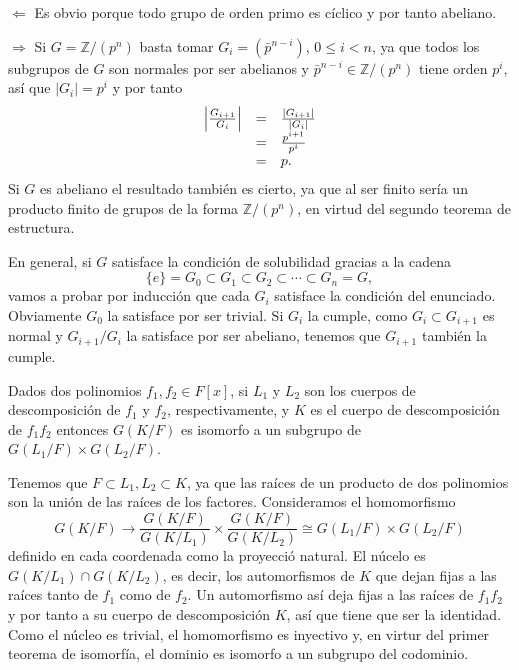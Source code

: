 \(\Leftarrow\) Es obvio porque todo grupo de orden primo es cíclico y
por tanto abeliano.

\(\Rightarrow\) Si \(G=\mathbb{Z}/(p^n)\) basta tomar
\(G_i=(\bar{p}^{n-i})\), \(0\leq i<n\), ya que todos los subgrupos de
\(G\) son normales por ser abelianos y
\(\bar{p}^{n-i}\in\mathbb{Z}/(p^n)\) tiene orden \(p^i\), así que
\(|G_i|=p^i\) y por tanto \[
\begin{array}{rcl}
\left|\frac{G_{i+1}}{G_i}\right|&=&\frac{|G_{i+1}|}{|G_i|}\cr
&=&\frac{p^{i+1}}{p^i}\cr
&=&p.
\end{array}\] Si \(G\) es abeliano el resultado también es cierto, ya
que al ser finito sería un producto finito de grupos de la forma
\(\mathbb{Z}/(p^n)\), en virtud del segundo teorema de estructura.

En general, si \(G\) satisface la condición de solubilidad gracias a la
cadena \[
\{e\}=G_0 \subset G_1 \subset G_2 \subset \cdots\subset G_n=G,
\] vamos a probar por inducción que cada \(G_i\) satisface la condición
del enunciado. Obviamente \(G_0\) la satisface por ser trivial. Si
\(G_i\) la cumple, como \(G_i\subset G_{i+1}\) es normal y
\(G_{i+1}/G_i\) la satisface por ser abeliano, tenemos que
\(G_{i+1}\) también la cumple. 


Dados dos polinomios \(f_1,f_2\in F[x]\), si \(L_1\) y \(L_2\) son
los cuerpos de descomposición de \(f_1\) y \(f_2\), respectivamente, y
\(K\) es el cuerpo de descomposición de \(f_1f_2\) entonces \(G(K/F)\)
es isomorfo a un subgrupo de \(G(L_1/F)\times G(L_2/F)\). 


Tenemos que \(F\subset L_1,L_2\subset K\), ya que las raíces de un
producto de dos polinomios son la unión de las raíces de los factores.
Consideramos el homomorfismo
\[G(K/F)\longrightarrow\frac{G(K/F)}{G(K/L_1)}\times \frac{G(K/F)}{G(K/L_2)}\cong G(L_1/F)\times G(L_2/F)\]
definido en cada coordenada como la proyecció natural. El núcelo es
\(G(K/L_1)\cap G(K/L_2)\), es decir, los automorfismos de \(K\) que
dejan fijas a las raíces tanto de \(f_1\) como de \(f_2\). Un
automorfismo así deja fijas a las raíces de \(f_1f_2\) y por tanto a
su cuerpo de descomposición \(K\), así que tiene que ser la identidad.
Como el núcleo es trivial, el homomorfismo es inyectivo y, en virtur del
primer teorema de isomorfía, el dominio es isomorfo a un subgrupo del
codominio. 


